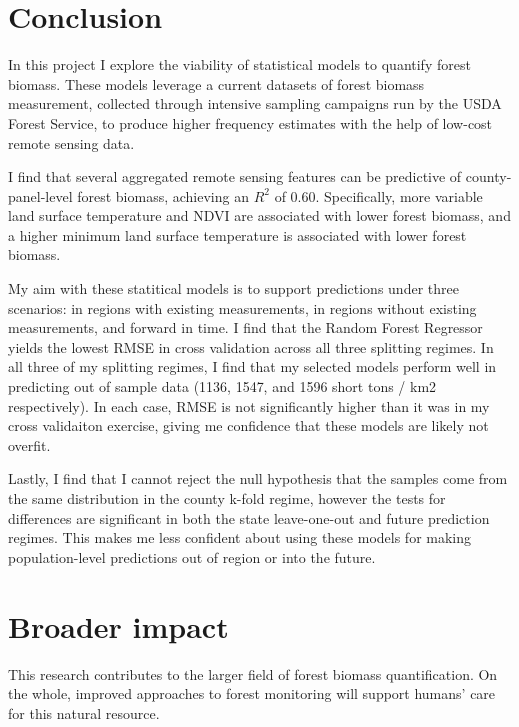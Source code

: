 \documentclass{article}
\begin{document}
\section{Conclusion}
In this project I explore the viability of statistical models to quantify forest biomass. These models leverage a current datasets of forest biomass measurement, collected through intensive sampling campaigns run by the USDA Forest Service, to produce higher frequency estimates with the help of low-cost remote sensing data. 

I find that several aggregated remote sensing features can be predictive of county-panel-level forest biomass, achieving an $R^2$ of 0.60. Specifically, more variable land surface temperature and NDVI are associated with lower forest biomass, and a higher minimum land surface temperature is associated with lower forest biomass.

My aim with these statitical models is to support predictions under three scenarios: in regions with existing measurements, in regions without existing measurements, and forward in time. I find that the Random Forest Regressor yields the lowest RMSE in cross validation across all three splitting regimes. In all three of my splitting regimes, I find that my selected models perform well in predicting out of sample data (1136, 1547, and 1596 short tons / km2 respectively). In each case, RMSE is not significantly higher than it was in my cross validaiton exercise, giving me confidence that these models are likely not overfit. 

Lastly, I find that I cannot reject the null hypothesis that the samples come from the same distribution in the county k-fold regime, however the tests for differences are significant in both the state leave-one-out and future prediction regimes. This makes me less confident about using these models for making population-level predictions out of region or into the future.

\section*{Broader impact}

This research contributes to the larger field of forest biomass quantification. On the whole, improved approaches to forest monitoring will support humans' care for this natural resource. 
\end{document}
